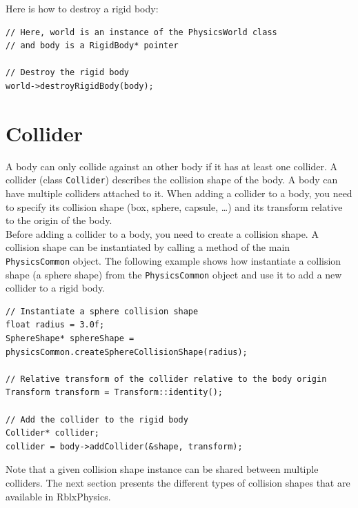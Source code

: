 \documentclass[a4paper,12pt]{article}
\begin{document}
    Here is how to destroy a rigid body: \\

    \begin{lstlisting}
// Here, world is an instance of the PhysicsWorld class
// and body is a RigidBody* pointer

// Destroy the rigid body
world->destroyRigidBody(body);
  \end{lstlisting}

    \section{Collider}
    \label{sec:collider}

    A body can only collide against an other body if it has at least one collider. A collider (class \texttt{Collider}) describes the collision shape
    of the body. A body can have multiple colliders attached to it. When adding a collider to a body, you need to specify its collision
    shape (box, sphere, capsule, \dots) and its transform relative to the origin of the body. \\

    Before adding a collider to a body, you need to create a collision shape. A collision shape can be instantiated by calling a method of the
    main \texttt{PhysicsCommon} object. The following example shows how instantiate a collision shape (a sphere shape) from the \texttt{PhysicsCommon}
    object and use it to add a new collider to a rigid body. \\

    \begin{lstlisting}
// Instantiate a sphere collision shape
float radius = 3.0f;
SphereShape* sphereShape = physicsCommon.createSphereCollisionShape(radius);

// Relative transform of the collider relative to the body origin
Transform transform = Transform::identity();

// Add the collider to the rigid body
Collider* collider;
collider = body->addCollider(&shape, transform);

  \end{lstlisting}

    \vspace{0.6cm}

    Note that a given collision shape instance can be shared between multiple colliders. The next section presents the different types of collision
    shapes that are available in RblxPhysics.
\end{document}
